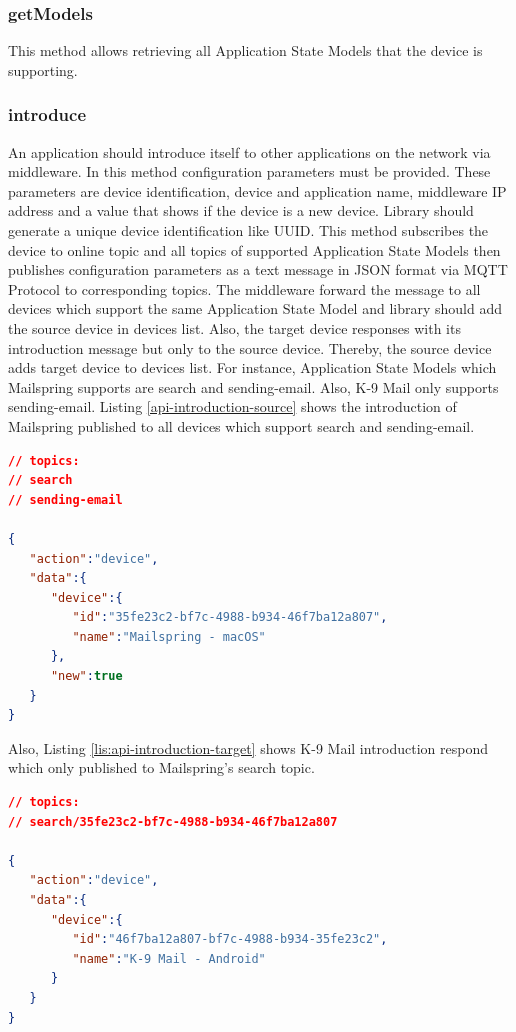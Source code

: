 \subsubsection{getModels}
This method allows retrieving all Application State Models that the device is supporting. 

\subsubsection{introduce}
An application should introduce itself to other applications on the network via middleware. In this method configuration parameters must be provided. These parameters are device identification, device and application name, middleware IP address and a value that shows if the device is a new device. Library should generate a unique device identification like UUID. This method subscribes the device to online topic and all topics of supported Application State Models then publishes configuration parameters as a text message in JSON format via MQTT Protocol to corresponding topics. The middleware forward the message to all devices which support the same Application State Model and library should add the source device in devices list. Also, the target device responses with its introduction message but only to the source device. Thereby, the source device adds target device to devices list. For instance, Application State Models which Mailspring supports are search and sending-email. Also, K-9 Mail only supports sending-email. Listing \ref{api-introduction-source} shows the introduction of Mailspring published to all devices which support search and sending-email. 

\lstset{
  label=lis:api-introduction-source,caption=The source device introduction message.
}
\begin{lstlisting}[language=json]
// topics:
// search
// sending-email

{
   "action":"device",
   "data":{
      "device":{
         "id":"35fe23c2-bf7c-4988-b934-46f7ba12a807",
         "name":"Mailspring - macOS"
      },
      "new":true
   }
}
\end{lstlisting}

Also, Listing \ref{lis:api-introduction-target} shows K-9 Mail introduction respond which only published to Mailspring's search topic.
\lstset{
  label=lis:api-introduction-target,caption=The target device introduction respond message.
}
\begin{lstlisting}[language=json]
// topics:
// search/35fe23c2-bf7c-4988-b934-46f7ba12a807

{
   "action":"device",
   "data":{
      "device":{
         "id":"46f7ba12a807-bf7c-4988-b934-35fe23c2",
         "name":"K-9 Mail - Android"
      }
   }
}
\end{lstlisting}
